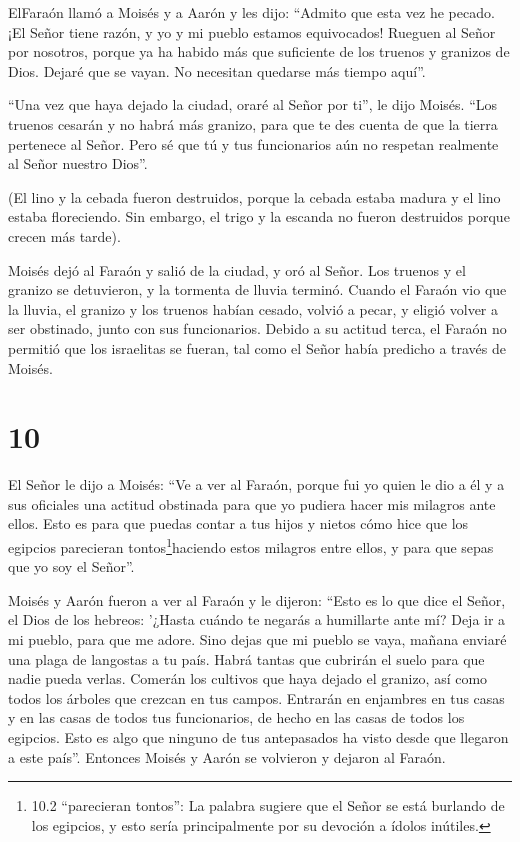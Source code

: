  ElFaraón llamó a Moisés y a Aarón y les dijo: ``Admito que
esta vez he pecado. ¡El Señor tiene razón, y yo y mi pueblo estamos
equivocados!  Rueguen al Señor por nosotros, porque ya ha
habido más que suficiente de los truenos y granizos de Dios. Dejaré que
se vayan. No necesitan quedarse más tiempo aquí''.

 ``Una vez que haya dejado la ciudad, oraré al Señor por
ti'', le dijo Moisés. ``Los truenos cesarán y no habrá más granizo, para
que te des cuenta de que la tierra pertenece al Señor. 
Pero sé que tú y tus funcionarios aún no respetan realmente al Señor
nuestro Dios''.

 (El lino y la cebada fueron destruidos, porque la cebada
estaba madura y el lino estaba floreciendo.  Sin embargo,
el trigo y la escanda no fueron destruidos porque crecen más tarde).

 Moisés dejó al Faraón y salió de la ciudad, y oró al
Señor. Los truenos y el granizo se detuvieron, y la tormenta de lluvia
terminó.  Cuando el Faraón vio que la lluvia, el granizo y
los truenos habían cesado, volvió a pecar, y eligió volver a ser
obstinado, junto con sus funcionarios.  Debido a su actitud
terca, el Faraón no permitió que los israelitas se fueran, tal como el
Señor había predicho a través de Moisés.

\hypertarget{section-9}{%
\section{10}\label{section-9}}

 El Señor le dijo a Moisés: ``Ve a ver al Faraón, porque fui
yo quien le dio a él y a sus oficiales una actitud obstinada para que yo
pudiera hacer mis milagros ante ellos.  Esto es para que
puedas contar a tus hijos y nietos cómo hice que los egipcios parecieran
tontos\footnote{10.2 ``parecieran tontos'': La palabra sugiere que el
  Señor se está burlando de los egipcios, y esto sería principalmente
  por su devoción a ídolos inútiles.}haciendo estos milagros entre
ellos, y para que sepas que yo soy el Señor''.

 Moisés y Aarón fueron a ver al Faraón y le dijeron: ``Esto
es lo que dice el Señor, el Dios de los hebreos: '¿Hasta cuándo te
negarás a humillarte ante mí? Deja ir a mi pueblo, para que me adore.
 Sino dejas que mi pueblo se vaya, mañana enviaré una plaga
de langostas a tu país.  Habrá tantas que cubrirán el suelo
para que nadie pueda verlas. Comerán los cultivos que haya dejado el
granizo, así como todos los árboles que crezcan en tus campos.
 Entrarán en enjambres en tus casas y en las casas de todos
tus funcionarios, de hecho en las casas de todos los egipcios. Esto es
algo que ninguno de tus antepasados ha visto desde que llegaron a este
país''. Entonces Moisés y Aarón se volvieron y dejaron al Faraón.

